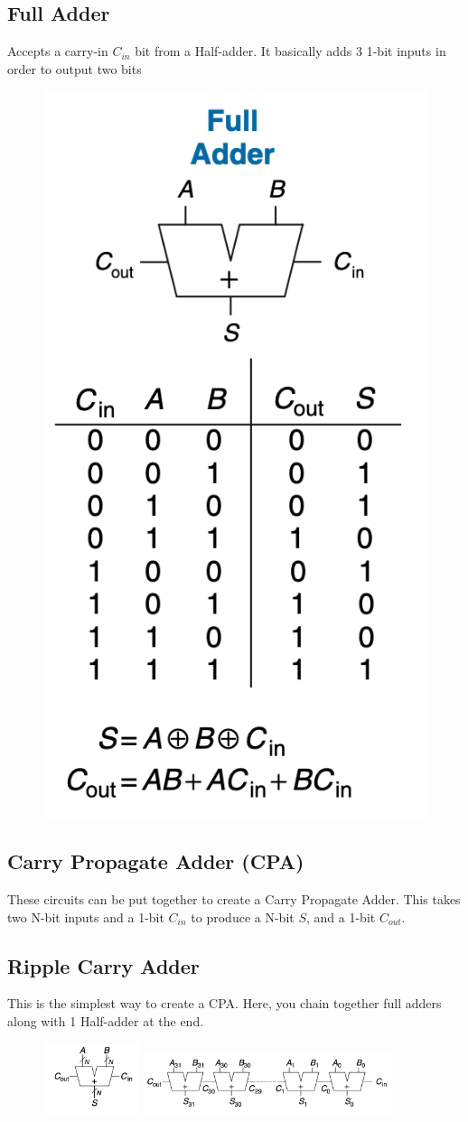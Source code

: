 \documentclass[12pt]{report}
\begin{document}
\subsection{Full Adder}
\noindent Accepts a carry-in $C_{in}$ bit from a Half-adder. It basically adds 3 1-bit inputs in order to output two bits \medskip
\begin{figure}[h!]
  \centering
  \includegraphics[width=.25\textwidth]{full-adder.png}
\end{figure}

\subsection{Carry Propagate Adder (CPA)}
\noindent These circuits can be put together to create a Carry Propagate Adder. This takes two N-bit inputs
and a 1-bit $C_{in}$ to produce a N-bit $S$, and a 1-bit $C_{out}$.

\subsection{Ripple Carry Adder}
\noindent This is the simplest way to create a CPA. Here, you chain together full adders along with 1 Half-adder at the end. 
\begin{figure}[h!]
  \centering
  \includegraphics[width=0.25\textwidth]{Carry-Propagate-adder.png} %
  \hspace{0.05\textwidth} %
  \includegraphics[width=0.65\textwidth]{Ripple-carry-adder.png} %
\end{figure}
\end{document}
